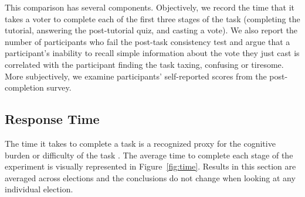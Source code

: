 \documentclass{comsoc2023}
\begin{document}
This comparison has several components. Objectively, we record the time that it takes a voter to complete each of the first three stages of the task (completing the tutorial, answering the post-tutorial quiz, and casting a vote). %
We also report the number  of participants who fail the post-task consistency test and argue that a participant's inability  to recall simple information about the vote they just cast is correlated with the participant finding the task taxing, confusing or tiresome. 
More subjectively, we examine participants' self-reported scores from the post-completion survey. 


 


\subsection{Response Time}
The time it takes to complete a task is a recognized  proxy for  the cognitive burden  or difficulty of the task  \cite{rauterberg1992method}.  
%
The average time to complete each stage of the experiment is visually represented in  Figure~\ref{fig:time}.  Results in this section are averaged across elections and the conclusions do not change when looking at any individual election. %
\end{document}
